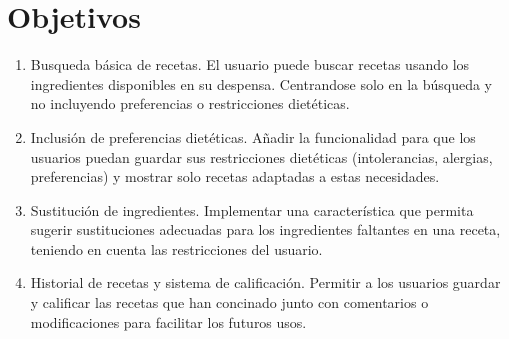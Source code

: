 \section{Objetivos}
\begin{enumerate}
    \item Busqueda básica de recetas. El usuario puede buscar recetas usando los ingredientes disponibles en su despensa. Centrandose solo en la búsqueda y no incluyendo preferencias o restricciones dietéticas.
    \item Inclusión de preferencias dietéticas. Añadir la funcionalidad para que los usuarios puedan guardar sus restricciones dietéticas (intolerancias, alergias, preferencias) y mostrar solo recetas adaptadas a estas necesidades.
    \item Sustitución de ingredientes. Implementar una característica que permita sugerir sustituciones adecuadas para los ingredientes faltantes en una receta, teniendo en cuenta las restricciones del usuario.
    \item Historial de recetas y sistema de calificación. Permitir a los usuarios guardar y calificar las recetas que han concinado junto con comentarios o modificaciones para facilitar los futuros usos.
\end{enumerate}